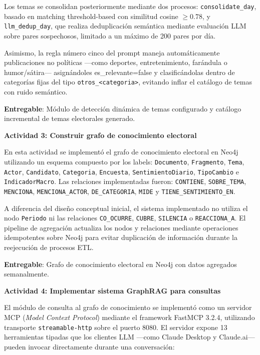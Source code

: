 Los temas se consolidan posteriormente mediante dos procesos: \texttt{consolidate\_day}, basado en matching threshold-based con similitud cosine $\geq 0.78$, y \texttt{llm\_dedup\_day}, que realiza deduplicación semántica mediante evaluación LLM sobre pares sospechosos, limitado a un máximo de 200 pares por día.

Asimismo, la regla número cinco del prompt maneja automáticamente publicaciones no políticas —como deportes, entretenimiento, farándula o humor/sátira— asignándoles es\_relevante=false y clasificándolas dentro de categorías fijas del tipo \texttt{otros\_<categoria>}, evitando inflar el catálogo de temas con ruido semántico.
 
\textbf{Entregable}: Módulo de detección dinámica de temas configurado y catálogo incremental de temas electorales generado.
 
\textbf{Actividad 3: Construir grafo de conocimiento electoral}
 
En esta actividad se implementó el grafo de conocimiento electoral en Neo4j utilizando un esquema compuesto por los labels: \texttt{Documento}, \texttt{Fragmento}, \texttt{Tema}, \texttt{Actor}, \texttt{Candidato}, \texttt{Categoria}, \texttt{Encuesta}, \texttt{SentimientoDiario}, \texttt{TipoCambio} e \texttt{IndicadorMacro}. Las relaciones implementadas fueron: \texttt{CONTIENE}, \texttt{SOBRE\_TEMA}, \texttt{MENCIONA}, \texttt{MENCIONA\_ACTOR}, \texttt{DE\_CATEGORIA}, \texttt{MIDE} y \texttt{TIENE\_SENTIMIENTO\_EN}.

A diferencia del diseño conceptual inicial, el sistema implementado no utiliza el nodo \texttt{Periodo} ni las relaciones \texttt{CO\_OCURRE}, \texttt{CUBRE}, \texttt{SILENCIA} o \texttt{REACCIONA\_A}. El pipeline de agregación actualiza los nodos y relaciones mediante operaciones idempotentes sobre Neo4j para evitar duplicación de información durante la reejecución de procesos ETL.
 
\textbf{Entregable}: Grafo de conocimiento electoral en Neo4j con datos agregados semanalmente.
 
\textbf{Actividad 4: Implementar sistema GraphRAG para consultas}
 
El módulo de consulta al grafo de conocimiento se implementó como un servidor MCP (\textit{Model Context Protocol}) mediante el framework FastMCP 3.2.4, utilizando transporte \texttt{streamable-http} sobre el puerto 8080. El servidor expone 13 herramientas tipadas que los clientes LLM —como Claude Desktop y Claude.ai— pueden invocar directamente durante una conversación:

